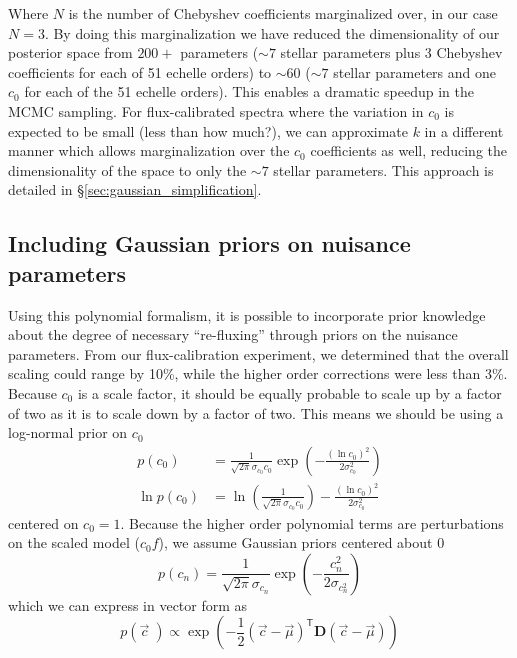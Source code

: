 \documentclass[preprint]{aastex} %
\newcommand{\vc}{\vec{c}}
\newcommand{\trans}{\mathsf{T}}
\begin{document}
Where $N$ is the number of Chebyshev coefficients marginalized over, in our case $N=3$. By doing this marginalization we have reduced the dimensionality of our posterior space from $200+$ parameters ($\sim 7$ stellar parameters plus 3 Chebyshev coefficients for each of 51 echelle orders) to $\sim 60$ ($\sim 7$ stellar parameters and one $c_0$ for each of the 51 echelle orders). This enables a dramatic speedup in the MCMC sampling. For flux-calibrated spectra where the variation in $c_0$ is expected to be small (less than how much?), we can approximate $k$ in a different manner which allows marginalization over the $c_0$ coefficients as well, reducing the dimensionality of the space to only the $\sim 7$ stellar parameters. This approach is detailed in \S\ref{sec:gaussian_simplification}.

\subsection{Including Gaussian priors on nuisance parameters}
\label{sec:priors}
Using this polynomial formalism, it is possible to incorporate prior knowledge about the degree of necessary ``re-fluxing'' through priors on the nuisance parameters. From our flux-calibration experiment, we determined that the overall scaling could range by 10\%, while the higher order corrections were less than 3\%. Because $c_0$ is a scale factor, it should be equally probable to scale up by a factor of two as it is to scale down by a factor of two. This means we should be using a log-normal prior on $c_0$
\begin{align}
  p(c_0) &= \frac{1}{\sqrt{2 \pi} \sigma_{c_0} c_0} \exp \left( -\frac{(\ln c_0)^2}{2 \sigma_{c_0}^2} \right) \\
  \ln p(c_0) &= \ln \left( \frac{1}{\sqrt{2 \pi} \sigma_{c_0} c_0} \right) - \frac{(\ln c_0)^2}{2 \sigma_{c_0}^2}
\end{align}
centered on $c_0 = 1$. Because the higher order polynomial terms are perturbations on the scaled model ($c_0 f$), we assume Gaussian priors centered about 0
\begin{equation}
  p(c_n) = \frac{1}{\sqrt{2 \pi} \sigma_{c_n}} \exp \left( - \frac{c_n^2}{2 \sigma_{c_n^2}} \right)
\end{equation}
which we can express in vector form as
\begin{equation}
  p(\vc\;) \propto \exp \left ( -\frac{1}{2} (\vc - \vec{\mu})^\trans {\bm D} (\vc - \vec{\mu}) \right )
  \label{eqn:nuisance_prior} 
\end{equation}
\end{document}
